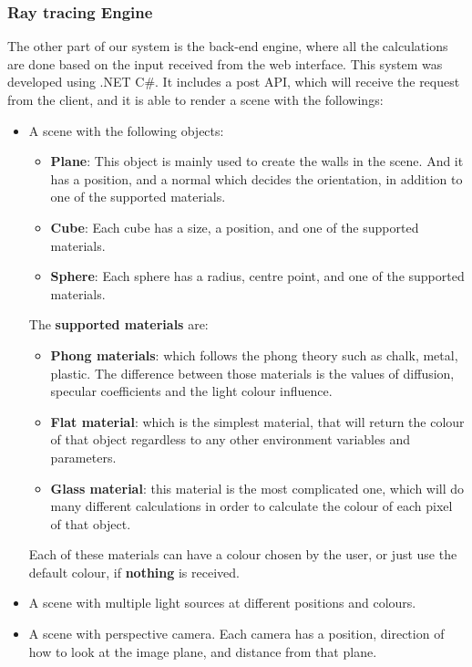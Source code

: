 \documentclass{article}
\begin{document}
	\subsubsection{Ray tracing Engine}
	The other part of our system is the back-end engine, where all the calculations are done based on the input received from the web interface. This system was developed using .NET C\#. It includes a post API, which will receive the request from the client, and it is able to render a scene with the followings:
	\begin{itemize}
		\item A scene with the following objects:
		\begin{itemize}
			\item \textbf{Plane}: This object is mainly used to create the walls in the scene. And it has a position, and a normal which decides the orientation, in addition to one of the supported materials.
			\item \textbf{Cube}: Each cube has a size, a position, and one of the supported materials.
			\item \textbf{Sphere}: Each sphere has a radius, centre point, and one of the supported materials.
		\end{itemize}
		The  \textbf{supported materials} are:
		\begin{itemize}
			\item \textbf{Phong materials}:  which follows the phong theory such as chalk, metal, plastic. The difference between those materials is the values of diffusion, specular coefficients and the light colour influence.
			\item \textbf{Flat material}: which is the simplest material, that will return the colour of that object regardless to any other environment variables and parameters.
			\item \textbf {Glass material}: this material is the most complicated one, which will do many different calculations in order to calculate the colour of each pixel of that object.
		\end{itemize}
		Each of these materials can have a colour chosen by the user, or just use the default colour, if \textbf{nothing} is received.
		\item A scene with multiple light sources at different positions and colours.
		\item A scene with perspective camera. Each camera has a position, direction of how to look at the image plane, and distance from that plane.
	\end{itemize}
\end{document}
